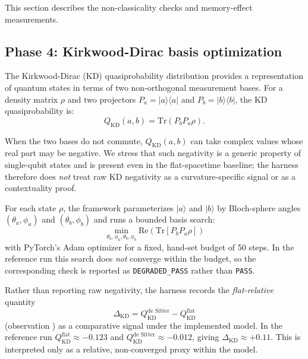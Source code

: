 
This section describes the non-classicality checks and memory-effect measurements.

\subsection{Phase 4: Kirkwood-Dirac basis optimization}
The Kirkwood-Dirac (KD) quasiprobability distribution provides a representation of quantum states in terms of two non-orthogonal measurement bases. For a density matrix $\rho$ and two projectors $P_a = |a\rangle\langle a|$ and $P_b = |b\rangle\langle b|$, the KD quasiprobability is:
\begin{equation}
  Q_{\text{KD}}(a, b) = \text{Tr}(P_b P_a \rho).
  \label{eq:kd_formula}
\end{equation}

When the two bases do not commute, $Q_{\text{KD}}(a, b)$ can take complex values whose real part may be negative. We stress that such negativity is a generic property of single-qubit states and is present even in the flat-spacetime baseline; the harness therefore does \emph{not} treat raw KD negativity as a curvature-specific signal or as a contextuality proof.

For each state $\rho$, the framework parameterizes $|a\rangle$ and $|b\rangle$ by Bloch-sphere angles $(\theta_a, \phi_a)$ and $(\theta_b, \phi_b)$ and runs a bounded basis search:
\begin{equation}
  \min_{\theta_a, \phi_a, \theta_b, \phi_b} \text{Re}\left(\text{Tr}[P_b P_a \rho]\right)
  \label{eq:kd_opt}
\end{equation}
with PyTorch's Adam optimizer for a fixed, hand-set budget of 50 steps. In the reference run this search does \emph{not} converge within the budget, so the corresponding check  is reported as \texttt{DEGRADED\_PASS} rather than \texttt{PASS}.

Rather than reporting raw negativity, the harness records the \emph{flat-relative} quantity
\begin{equation}
  \Delta_{\text{KD}} = Q^{\text{de Sitter}}_{\text{KD}} - Q^{\text{flat}}_{\text{KD}}
  \label{eq:kd_delta}
\end{equation}
(observation ) as a comparative signal under the implemented model. In the reference run $Q^{\text{flat}}_{\text{KD}} \approx -0.123$ and $Q^{\text{de Sitter}}_{\text{KD}} \approx -0.012$, giving $\Delta_{\text{KD}} \approx +0.11$. This is interpreted only as a relative, non-converged proxy within the model.

